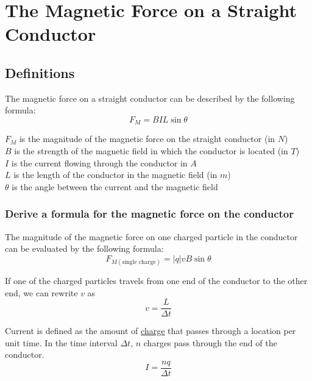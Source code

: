 \section{The Magnetic Force on a Straight Conductor}
\subsection{Definitions}
\begin{theorem}
    The magnetic force on a straight conductor can be described by the following formula:
    \begin{equation*}
        F_M = BIL\sin\theta
    \end{equation*}
    \begin{center}
        $F_M$ is the magnitude of the magnetic force on the straight conductor (in $N$)\\
        $B$ is the strength of the magnetic field in which the conductor is located (in $T$)\\
        $I$ is the current flowing through the conductor in $A$\\
        $L$ is the length of the conductor in the magnetic field (in $m$)\\
        $\theta$ is the angle between the current and the magnetic field
    \end{center}
\end{theorem}
\subsubsection{Derive a formula for the magnetic force on the conductor}

\begin{lemma}
    The magnitude of the magnetic force on one charged particle in the conductor can be evaluated by the following formula:
    \begin{equation}
        F_{M(\text{single charge})} = \left|q\right|vB\sin\theta \label{eq4.9.3}
    \end{equation}
\end{lemma}

\begin{lemma}
    If one of the charged particles travels from one end of the conductor to the other end, we can rewrite $v$ as
    \begin{equation}
        v = \frac{L}{\Delta t} \label{eq4.9.2}
    \end{equation}
\end{lemma}

\begin{lemma}
    Current is defined as the amount of \underline{charge} that passes through a location per unit time. In the time interval $\Delta t$, $n$ charges 
    pass through the end of the conductor.
    \begin{equation}
        I = \frac{nq}{\Delta t} \label{eq4.9.4}
    \end{equation} 
\end{lemma}

